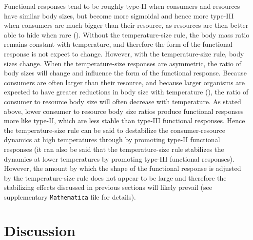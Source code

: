 \documentclass[11pt]{article}
\begin{document}
Functional responses tend to be roughly type-II when consumers and resources have similar body sizes, but become more sigmoidal and hence more type-III when consumers are much bigger than their resource, as resources are then better able to hide when rare (\cite{Kalinkat2013}).
Without the temperature-size rule, the body mass ratio remains constant with temperature, and therefore the form of the functional response is not expect to change.
However, with the temperature-size rule, body sizes change.
When the temperature-size responses are asymmetric, the ratio of body sizes will change and influence the form of the functional response.
Because consumers are often larger than their resource, and because larger organisms are expected to have greater reductions in body size with temperature (\cite{Forster2012}), the ratio of consumer to resource body size will often decrease with temperature.
As stated above, lower consumer to resource body size ratios produce functional responses more like type-II, which are less stable than type-III functional responses.
Hence the temperature-size rule can be said to destabilize the consumer-resource dynamics at high temperatures through by promoting type-II functional responses (it can also be said that the temperature-size rule stabilizes the dynamics at lower temperatures by promoting type-III functional responses).
However, the amount by which the shape of the functional response is adjusted by the temperature-size rule does not appear to be large and therefore the stabilizing effects discussed in previous sections will likely prevail (see supplementary \texttt{Mathematica} file for details). 

\section*{Discussion}


\end{document}
